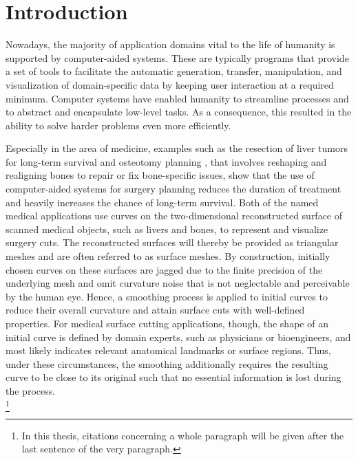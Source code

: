 \documentclass{stdlocal}
\begin{document}
\section{Introduction} %
\label{sec:introduction}

  Nowadays, the majority of application domains vital to the life of humanity is supported by computer-aided systems.
  These are typically programs that provide a set of tools to facilitate the automatic generation, transfer, manipulation, and visualization of domain-specific data by keeping user interaction at a required minimum.
  Computer systems have enabled humanity to streamline processes and to abstract and encapsulate low-level tasks.
  As a consequence, this resulted in the ability to solve harder problems even more efficiently.

  Especially in the area of medicine, examples such as the resection of liver tumors for long-term survival \autocite{alirr2019} and osteotomy planning \autocite{zachow2003}, that involves reshaping and realigning bones to repair or fix bone-specific issues, show that the use of computer-aided systems for surgery planning reduces the duration of treatment and heavily increases the chance of long-term survival.
  Both of the named medical applications use curves on the two-dimensional reconstructed surface of scanned medical objects, such as livers and bones, to represent and visualize surgery cuts.
  The reconstructed surfaces will thereby be provided as triangular meshes and are often referred to as surface meshes.
  By construction, initially chosen curves on these surfaces are jagged due to the finite precision of the underlying mesh and omit curvature noise that is not neglectable and perceivable by the human eye.
  Hence, a smoothing process is applied to initial curves to reduce their overall curvature and attain surface cuts with well-defined properties.
  For medical surface cutting applications, though, the shape of an initial curve is defined by domain experts, such as physicians or bioengineers, and most likely indicates relevant anatomical landmarks or surface regions.
  Thus, under these circumstances, the smoothing additionally requires the resulting curve to be close to its original such that no essential information is lost during the process. \\
  \autocite{zachow2003,lawonn2014,alirr2019}\footnote{In this thesis, citations concerning a whole paragraph will be given after the last sentence of the very paragraph.}
\end{document}
